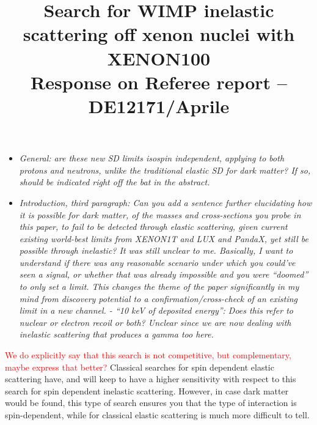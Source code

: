 \documentclass{article}
\begin{document}
\title{ \textbf{ Search for WIMP inelastic scattering off xenon nuclei with XENON100} \\  Response on Referee report -- DE12171/Aprile  }

\maketitle




\begin{itemize}
	\item {\em{General: are these new SD limits isospin independent, applying to both protons and neutrons, unlike the traditional elastic SD for dark matter? If so, should be indicated right off the bat in the abstract.}}
\end{itemize}


\begin{itemize}
	\item{ \em{Introduction, third paragraph: Can you add a sentence further
elucidating how it is possible for dark matter, of the masses and
cross-sections you probe in this paper, to fail to be detected through
elastic scattering, given current existing world-best limits from
XENON1T and LUX and PandaX, yet still be possible through inelastic?
It was still unclear to me. Basically, I want to understand if there
was any reasonable scenario under which you could’ve seen a signal, or
whether that was already impossible and you were “doomed” to only set
a limit. This changes the theme of the paper significantly in my mind
from discovery potential to a confirmation/cross-check of an existing
limit in a new channel. - “10 keV of deposited energy”: Does this
refer to nuclear or electron recoil or both? Unclear since we are now
dealing with inelastic scattering that produces a gamma too here.}}
\end{itemize}

\textcolor{red}{ We do explicitly say that this search is not competitive, but complementary, maybe express that better?}
Classical searches for spin dependent elastic scattering have, and will keep to have a 
higher sensitivity with respect to this search for spin dependent inelastic scattering.
However, in case dark matter would be found, this type of search ensures you that the type 
{\color{red} of interaction is spin-dependent, while for classical elastic scattering is much more difficult to tell.}
\end{document}
